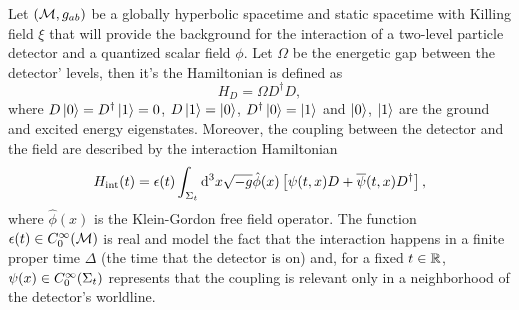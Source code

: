 Let \(({\mathcal{M}},g_{ab})\) be a globally hyperbolic spacetime and static spacetime with Killing field \(\xi\) that will provide the background for the interaction of a two-level particle detector and a quantized scalar field \(\phi\). Let \(\Omega\) be the energetic gap between the detector' levels, then it's the Hamiltonian is defined as
\begin{equation}
    H_D=\Omega D^{\dagger}D,
\end{equation}
where \(D\ket{0}=D^{\dagger}\ket{1}=0\), \(D\ket{1}=\ket{0}\), \(D^{\dagger}\ket{0}=\ket{1}\) and \(\ket{0}\), \(\ket{1}\) are the ground and excited energy eigenstates. Moreover, the coupling between the detector and the field are described by the interaction Hamiltonian
\begin{equation}
    H_{\text{int}}(t)=\epsilon(t)\int_{\Sigma_t}\mathrm{d}^3x\sqrt{-g}\hat{\phi}(x)\left[\psi(t,x)D+\overline{\psi}(t,x)D^{\dagger}\right],
\end{equation}
where \(\hat{\phi}(x)\) is the Klein-Gordon free field operator. The function \(\epsilon(t)\in C^{\infty}_0({\mathcal{M}})\) is real and model the fact that the interaction happens in a finite proper time \(\Delta\) (the time that the detector is on) and, for a fixed \(t\in{\mathbb{R}}\), \(\psi(x)\in C^{\infty}_0(\Sigma_t)\) represents that the coupling is relevant only in a neighborhood of the detector's worldline. 

